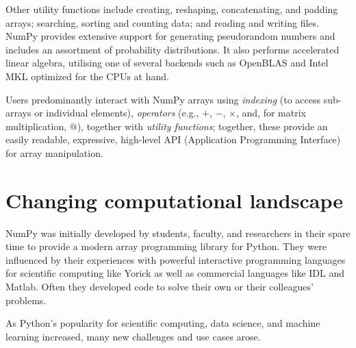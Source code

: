 Other utility functions include creating, reshaping, concatenating, and padding arrays; searching, sorting and counting data; and reading and writing files.  NumPy provides extensive support for generating pseudorandom numbers and includes an assortment of probability distributions. It also performs accelerated linear algebra, utilising one of several backends such as OpenBLAS and Intel MKL optimized for the CPUs at hand.

Users predominantly interact with NumPy arrays using {\em indexing} (to access sub-arrays or individual elements), {\em operators} (e.g., $+$, $-$, $\times$, and, for matrix multiplication, $@$), together with {\em utility functions}; together, these provide an easily readable, expressive, high-level API (Application Programming Interface) for array manipulation.


\section*{Changing computational landscape}

NumPy was initially developed by students, faculty, and researchers in their
spare time to provide a modern array programming library for Python.
They were influenced by their experiences with powerful interactive programming
languages for scientific computing like Yorick \cite{munro1995using} as well
as commercial languages like IDL and Matlab.
Often they developed code to solve their own or their colleagues' problems.

As Python's popularity for scientific computing, data science, and machine
learning increased, many new challenges and use cases arose.


